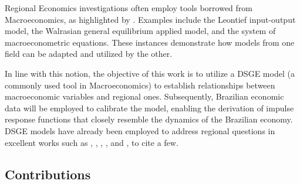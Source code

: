 \documentclass[../thesis.tex]{subfiles}
\begin{document}

Regional Economics investigations often employ tools borrowed from Macroeconomics, as highlighted by \textcite{rickman_modern_2010}. Examples include the Leontief input-output model, the Walrasian general equilibrium applied model, and the system of macroeconometric equations. These instances demonstrate how models from one field can be adapted and utilized by the other.

In line with this notion, the objective of this work is to utilize a DSGE model (a commonly used tool in Macroeconomics) to establish relationships between macroeconomic variables and regional ones. Subsequently, Brazilian economic data will be employed to calibrate the model, enabling the derivation of impulse response functions that closely resemble the dynamics of the Brazilian economy. DSGE models have already been employed to address regional questions in excellent works such as \textcite{tamegawa_two-region_2012}, \textcite{tamegawa_constructing_2013}, \textcite{mora_fdi_2019}, \textcite{costa_junior_dsge_2022}, and \textcite{osterno_uma_2022}, to cite a few.

\subsection*{Contributions}

\end{document}
